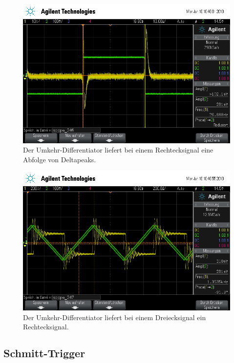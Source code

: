 \begin{figure}[h]
	\centering
	\includegraphics[width=\textwidth]{usb/scope_246.png}
	\caption{Der Umkehr-Differentiator liefert bei einem Rechtecksignal eine Abfolge von Deltapeaks.}
	\label{scope_246}
\end{figure}
\begin{figure}[h]
	\centering
	\includegraphics[width=\textwidth]{usb/scope_247.png}
	\caption{Der Umkehr-Differentiator liefert bei einem Dreiecksignal ein Rechtecksignal.}
	\label{scope_247}
\end{figure}

\FloatBarrier

\subsection{Schmitt-Trigger}

